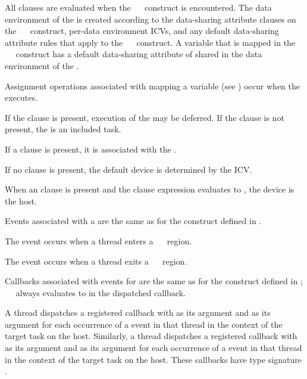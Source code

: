 All clauses are evaluated when the ~~ construct 
is encountered.  The data environment of the  is created according 
to the data-sharing attribute clauses on the ~~ 
construct, per-data environment ICVs, and any default data-sharing attribute rules 
that apply to the ~~ construct.  A variable that 
is mapped in the ~~ construct has a default 
data-sharing attribute of shared in the data environment of the .

Assignment operations associated with mapping a variable (see 
) occur when the  executes.

If the  clause is present, execution of the  may be 
deferred.  If the  clause is not present, the  is an 
included task.

If a  clause is present, it is associated with the .

If no  clause is present, the default device is determined by the 
 ICV.

When an  clause is present and the  clause expression evaluates 
to , the device is the host.

\events

Events associated with a  are the same as for the  
construct defined in .

The  event occurs when a thread enters a
~~ region.

The  event occurs when a thread exits a
~~ region.

\tools

Callbacks associated with events for  are the same as
for the  construct defined in ;
\code{(}~\code{&}~ 
always evaluates to  in the dispatched callback.

A thread dispatches a registered  callback with
 as its  argument and
 as its  argument for each occurrence
of a  event in that thread in the context of the
target task on the host. Similarly, a thread dispatches a registered
 callback with  as its
 argument and  as its 
argument for each occurrence of a  event in that thread
in the context of the target task on the host. These callbacks have
type signature . 

